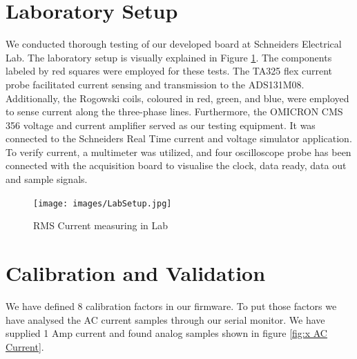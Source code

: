 \section{Laboratory Setup}
We conducted thorough testing of our developed board at Schneiders Electrical Lab. The laboratory setup is visually explained in Figure \ref{fig:x Lab}. The components labeled by red squares were employed for these tests. The TA325 flex current probe facilitated current sensing and transmission to the ADS131M08. Additionally, the Rogowski coils, coloured in red, green, and blue, were employed to sense current along the three-phase lines. Furthermore, the OMICRON CMS 356 voltage and current amplifier served as our testing equipment. It was connected to the Schneiders Real Time current and voltage simulator application. To verify current, a multimeter was utilized, and four oscilloscope probe has been connected with the acquisition board to visualise the clock, data ready, data out and sample signals.
\begin{figure}[htbp]
\centering
\texttt{[image: images/LabSetup.jpg]}
\caption{RMS Current measuring in Lab}
\label{fig:x Lab}
\end{figure}
\section{Calibration and Validation}
We have defined 8 calibration factors in our firmware. To put those factors we have analysed the AC current samples through our serial monitor. We have supplied 1 Amp current and found analog samples shown in figure \ref{fig:x AC Current}. 

